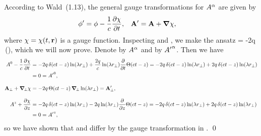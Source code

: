 \begin{solution}
	According to Wald~(1.13), the general gauge transformations for $A^\alpha$ are given by
	\begin{align*}
		\phi' &= \phi - \frac{1}{c} \pdv{\chi}{t}, &
		\vb{A}' &= \vb{A} + \grad\chi,
	\end{align*}
	where $\chi = \chi(t, \vb{r})$ is a gauge function.  Inspecting  and , we make the ansatz
	\beqn \label{chi}
		{\color{blue} \chi = -2q \,\Thtctz \ln(\lam \rperp)},
	\eeqn
	which we will now prove.  Denote  by $A^\alpha$ and  by ${A'}^\alpha$.  Then we have
	\begin{align*}
		A^0 - \frac{1}{c} \pdv{\chi}{t} &= -2q \,\delta(ct - z) \ln(\lambda r_\perp) + \frac{2q}{c} \ln(\lambda r_\perp) \pdv{t} \Theta(ct - z)
		= -2q \,\delta(ct - z) \ln(\lambda r_\perp) + 2q \,\delta(ct - z) \ln(\lambda r_\perp) \\
		&= 0
		= {A'}^0, \\[2ex]
		\vb{A}_\perp + \grad_{\!\perp} \chi &= -2q \,\Theta(ct - z) \, \grad_{\!\perp} \ln(\lambda r_\perp)
		= \vb{A}_\perp', \\[2ex]
		A^z + \pdv{\chi}{z} &= -2q \,\delta(ct - z) \ln(\lambda r_\perp) - 2q \ln(\lambda r_\perp) \pdv{z} \Theta(ct - z)
		= -2q \,\delta(ct - z) \ln(\lambda r_\perp) + 2q \,\delta(ct - z) \ln(\lambda r_\perp) \\
		&= 0
		= {A'}^z,
	\end{align*}
	so we have shown that  and  differ by the gauge transformation in . \qed
\end{solution}